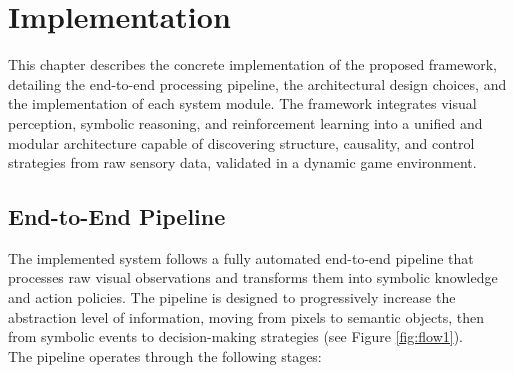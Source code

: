 \documentclass[12pt,a4paper]{report}
\begin{document}

\chapter{Implementation}
This chapter describes the concrete implementation of the proposed framework, detailing the end-to-end processing pipeline, the architectural design choices, and the implementation of each system module. The framework integrates visual perception, symbolic reasoning, and reinforcement learning into a unified and modular architecture capable of discovering structure, causality, and control strategies from raw sensory data, validated in a dynamic game environment.


\section{End-to-End Pipeline}
The implemented system follows a fully automated end-to-end pipeline that processes raw visual observations and transforms them into symbolic knowledge and action policies. The pipeline is designed to progressively increase the abstraction level of information, moving from pixels to semantic objects, then from symbolic events to decision-making strategies (see Figure \ref{fig:flow1}).
\\
The pipeline operates through the following stages:
\end{document}
